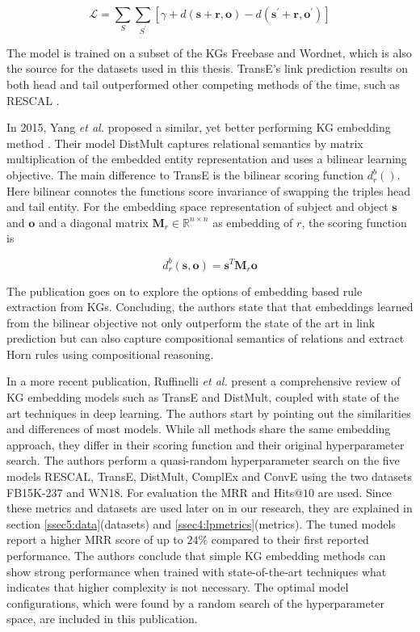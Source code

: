 \begin{equation}
    \mathcal{L}=\sum_{S} \sum_{S^{\prime}} \left[\gamma+d(\boldsymbol{s}+\boldsymbol{r}, \boldsymbol{o})-d\left(\boldsymbol{s}^{\prime}+\boldsymbol{r}, \boldsymbol{o}^{\prime}\right)\right]
\end{equation}

The model is trained on a subset of the KGs Freebase and Wordnet, which is also the source for the datasets used in this thesis. TransE's link prediction results on both head and tail outperformed other competing methods of the time, such as RESCAL \cite{nickel_three-way_nodate}.

In 2015, Yang \textit{et al.} proposed a similar, yet better performing KG embedding method \cite{yang_embedding_2015}. Their model DistMult captures relational semantics by matrix multiplication of the embedded entity representation and uses a bilinear learning objective. The main difference to TransE is the bilinear scoring function $d_{r}^{b}()$. Here bilinear connotes the functions score invariance of swapping the triples head and tail entity. For the embedding space representation of subject and object $\boldsymbol{s}$ and $\boldsymbol{o}$ and a diagonal matrix $\mathbf{M}_{r} \in \mathbb{R}^{n \times n}$ as embedding of $r$, the scoring function is

\begin{equation}
    d_{r}^{b}\left(\boldsymbol{s}, \boldsymbol{o}\right)=\boldsymbol{s}^{T} \mathbf{M}_{r} \boldsymbol{o}
    \label{eq2:distmult}
\end{equation}

The publication goes on to explore the options of embedding based rule extraction from KGs. Concluding, the authors state that that embeddings learned from the bilinear objective not only outperform the state of the art in link prediction but can also capture compositional semantics of relations and extract Horn rules using compositional reasoning.


In a more recent publication, Ruffinelli \textit{et al.} present a comprehensive review of KG embedding models such as TransE and DistMult, coupled with state of the art techniques in deep learning. The authors start by pointing out the similarities and differences of most models. While all methods share the same embedding approach, they differ in their scoring function and their original hyperparameter search. The authors perform a quasi-random hyperparameter search on the five models RESCAL, TransE, DistMult, ComplEx and ConvE using the two datasets FB15K-237 and WN18. For evaluation the MRR and Hits@$10$ are used. Since these metrics and datasets are used later on in our research, they are explained in section \ref{ssec5:data}(datasets) and \ref{ssec4:lpmetrics}(metrics). The tuned models report a higher MRR score of up to $24\%$ compared to their first reported performance. The authors conclude that simple KG embedding methods can show strong performance when trained with state-of-the-art techniques what indicates that higher complexity is not necessary. The optimal model configurations, which were found by a random search of the hyperparameter space, are included in this publication. 

